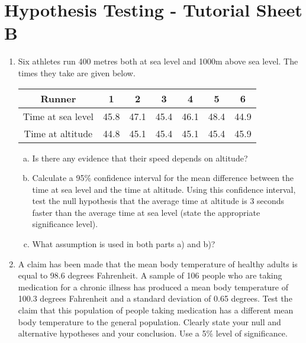 \documentclass[]{article}
\begin{document}
\section*{Hypothesis Testing - Tutorial Sheet B  }
\begin{enumerate}




\item 


Six athletes run 400 metres both at sea level and 1000m above sea level. The times they take are given below. 

\begin{center}
\begin{tabular}{|c|c|c|c|c|c|c|} \hline
Runner & 	1&	2 & 	3	& 4	& 5&  	6\\ \hline
Time at sea level&	45.8&	47.1&	45.4&	46.1 & 	48.4& 	44.9\\ \hline
Time at altitude&	44.8&	45.1&	45.4&	45.1 &	45.4& 	45.9\\ \hline
\end{tabular}
\end{center}
\begin{enumerate}[(a)]
    \item Is there any evidence that their speed depends on altitude? 
\item Calculate a 95\% confidence interval for the mean difference between the time at sea level and the time at altitude. Using this confidence interval, test the null hypothesis that the average time at altitude is 3 seconds faster than the average time at sea level (state the appropriate significance level).
\item What assumption is used in both parts a) and b)? 
\end{enumerate}
\item  A claim has been made that the mean body temperature of healthy adults is equal to 98.6 degrees Fahrenheit. A sample of 106 people who are taking medication for a chronic illness has produced a mean body temperature of 100.3 degrees Fahrenheit and a standard deviation of 0.65 degrees. Test the claim that this population of people taking medication has a different mean body temperature to the general population.  Clearly state your null and alternative hypotheses and your conclusion. Use a 5\% level of significance.





\end{enumerate}
\end{document}
